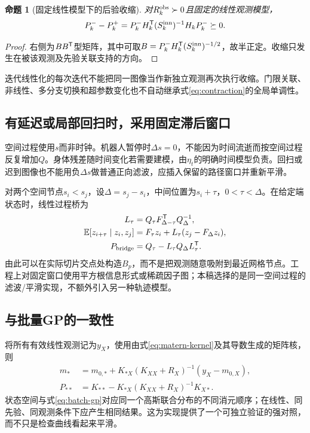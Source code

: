 \documentclass[UTF8,11pt,a4paper,fontset=fandol]{ctexart}
\numberwithin{equation}{section}
\theoremstyle{plain}
\newtheorem{proposition}{命题}[section]
\theoremstyle{definition}
\theoremstyle{remark}
\begin{document}
\begin{proposition}[固定线性模型下的后验收缩]
对$R_k^{\rm obs}\succ0$且固定的线性观测模型，
\begin{equation}
 P_k^- -P_k^+=P_k^-H_k^{\mathsf T}(S_k^{\rm inn})^{-1}H_kP_k^-\succeq0.
 \label{eq:contraction}
\end{equation}
\end{proposition}
\begin{proof}
右侧为$BB^{\mathsf T}$型矩阵，其中可取$B=P_k^-H_k^{\mathsf T}(S_k^{\rm inn})^{-1/2}$，故半正定。收缩只发生在被该观测及先验关联支持的方向。
\end{proof}

迭代线性化的每次迭代不能把同一图像当作新独立观测再次执行收缩。门限关联、非线性、多分支切换和超参数变化也不自动继承式\eqref{eq:contraction}的全局单调性。

\subsection{有延迟或局部回扫时，采用固定滞后窗口}
空间过程使用$s$而非时钟。机器人暂停时$\Delta s=0$，不能因为时间流逝而按空间过程反复增加$Q$。身体残差随时间变化若需要建模，由$\eta_t$的明确时间模型负责。回扫或迟到图像也不能用负$\Delta s$做普通正向滤波，应插入保留的路径窗口并重新平滑。

对两个空间节点$s_i<s_j$，设$\Delta=s_j-s_i$，中间位置为$s_i+\tau$，$0<\tau<\Delta$。在给定端状态时，线性过程桥为
\begin{align}
 L_\tau&=Q_\tau F_{\Delta-\tau}^{\mathsf T} Q_\Delta^{-1},\\
 \mathbb E[z_{i+\tau}\mid z_i,z_j]
 &=F_\tau z_i+L_\tau(z_j-F_\Delta z_i),\\
 P_{\rm bridge}&=Q_\tau-L_\tau Q_\Delta L_\tau^{\mathsf T}.
 \label{eq:gp-bridge}
\end{align}
由此可以在实际切片交点处构造$B_p$，而不是把观测随意吸附到最近网格节点。工程上对固定窗口使用平方根信息形式或稀疏因子图；本稿选择的是同一空间过程的滤波/平滑实现，不额外引入另一种轨迹模型。

\subsection{与批量GP的一致性}
将所有有效线性观测记为$y_X$，使用由式\eqref{eq:matern-kernel}及其导数生成的矩阵核，则
\begin{align}
 m_*&=m_{0,*}+K_{*X}(K_{XX}+R_X)^{-1}(y_X-m_{0,X}),\\
 P_{**}&=K_{**}-K_{*X}(K_{XX}+R_X)^{-1}K_{X*}.
 \label{eq:batch-gp}
\end{align}
状态空间与式\eqref{eq:batch-gp}对应同一个高斯联合分布的不同消元顺序；在线性、同先验、同观测条件下应产生相同结果。这为实现提供了一个可独立验证的强对照，而不只是检查曲线看起来平滑。
\end{document}
